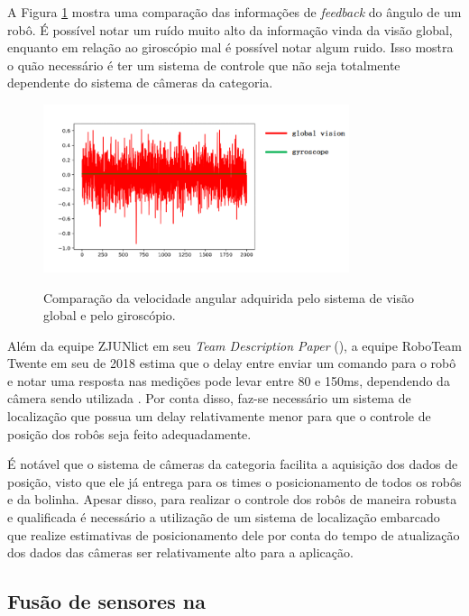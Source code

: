 \documentclass[acronym, symbols, table]{fei}
\begin{document}
			A Figura \ref{fig:comparison_cameras_gyroscope} mostra uma comparação das informações de \textit{feedback} do ângulo de um robô. É possível notar um ruído muito alto da informação vinda da visão global, enquanto em relação ao giroscópio mal é possível notar algum ruido. Isso mostra o quão necessário é ter um sistema de controle que não seja totalmente dependente do sistema de câmeras da categoria.
			
			\begin{figure}[!htb]
					\centering
					\caption{Comparação da velocidade angular adquirida pelo sistema de visão global e pelo giroscópio.} 
					\includegraphics[width=0.8\textwidth]{Comparacao_cameras_giroscopio.png}
					\label{fig:comparison_cameras_gyroscope}
				\end{figure}
		
			Além da equipe ZJUNlict em seu \textit{Team Description Paper} (), a equipe RoboTeam Twente em seu  de 2018 estima que o delay entre enviar um comando para o robô e notar uma resposta nas medições pode levar entre 80 e 150ms, dependendo da câmera sendo utilizada \cite{tdptwente2018}. Por conta disso, faz-se necessário um sistema de localização que possua um delay relativamente menor para que o controle de posição dos robôs seja feito adequadamente.
			
			É notável que o sistema de câmeras da categoria  facilita a aquisição dos dados de posição, visto que ele já entrega para os times o posicionamento de todos os robôs e da bolinha. Apesar disso, para realizar o controle dos robôs de maneira robusta e qualificada é necessário a utilização de um sistema de localização embarcado que realize estimativas de posicionamento dele por conta do tempo de atualização dos dados das câmeras ser relativamente alto para a aplicação.
			
			\subsection{Fusão de sensores na }
			
\end{document}
